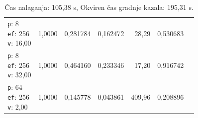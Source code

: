 \begin{table}[htbp]
\begin{tabularx}{\textwidth}{Xrrrrrr}
    \makecell{\texttt{p}: 8\\\texttt{ef}: 256\\\texttt{v}: 16,00} & 1,0000 & 0,281784 & 0,162472 & 28,29 & 0,530683 \\
    \makecell{\texttt{p}: 8\\\texttt{ef}: 256\\\texttt{v}: 32,00} & 1,0000 & 0,464160 & 0,233346 & 17,20 & 0,916742 \\
    \makecell{\texttt{p}: 64\\\texttt{ef}: 256\\\texttt{v}: 2,00} & 1,0000 & 0,145778 & 0,043861 & 409,96 & 0,208896 \\
    \bottomrule
  \end{tabularx}
\caption* {Čas nalaganja: 105,38 s, Okviren čas gradnje kazala: 195,31 s.}\end{table}
